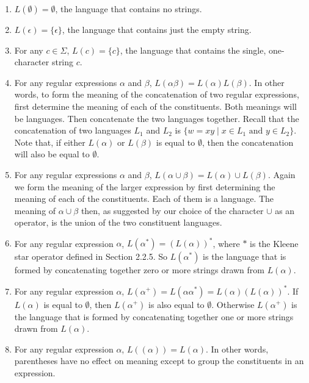 \documentclass{article}
\begin{document}
\begin{enumerate}
    \item \( L(\emptyset) = \emptyset \), the language that contains no strings.
    \item \( L(\epsilon) = \{\epsilon\} \), the language that contains just the empty string.
    \item For any \( c \in \Sigma \), \( L(c) = \{c\} \), the language that contains the single, one-character string \( c \).
    \item For any regular expressions \( \alpha \) and \( \beta \), \( L(\alpha \beta) = L(\alpha) L(\beta) \). In other words, to form the meaning of the concatenation of two regular expressions, first determine the meaning of each of the constituents. Both meanings will be languages. Then concatenate the two languages together. Recall that the concatenation of two languages \( L_1 \) and \( L_2 \) is \( \{ w = xy \mid x \in L_1 \text{ and } y \in L_2 \} \). Note that, if either \( L(\alpha) \) or \( L(\beta) \) is equal to \( \emptyset \), then the concatenation will also be equal to \( \emptyset \).
    \item For any regular expressions \( \alpha \) and \( \beta \), \( L(\alpha \cup \beta) = L(\alpha) \cup L(\beta) \). Again we form the meaning of the larger expression by first determining the meaning of each of the constituents. Each of them is a language. The meaning of \( \alpha \cup \beta \) then, as suggested by our choice of the character \( \cup \) as an operator, is the union of the two constituent languages.
    \item For any regular expression \( \alpha \), \( L(\alpha^*) = (L(\alpha))^* \), where \( * \) is the Kleene star operator defined in Section 2.2.5. So \( L(\alpha^*) \) is the language that is formed by concatenating together zero or more strings drawn from \( L(\alpha) \).
    \item For any regular expression \( \alpha \), \( L(\alpha^+) = L(\alpha \alpha^*) = L(\alpha) (L(\alpha))^* \). If \( L(\alpha) \) is equal to \( \emptyset \), then \( L(\alpha^+) \) is also equal to \( \emptyset \). Otherwise \( L(\alpha^+) \) is the language that is formed by concatenating together one or more strings drawn from \( L(\alpha) \).
    \item For any regular expression \( \alpha \), \( L((\alpha)) = L(\alpha) \). In other words, parentheses have no effect on meaning except to group the constituents in an expression.
\end{enumerate}
\end{document}

